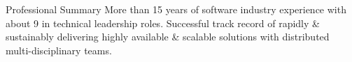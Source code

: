 \documentclass{resume} %
\begin{document}
\vspace{1em}

\begin{rSection}{Professional Summary}
More than 15 years of software industry experience with about 9 in technical leadership roles. Successful track record of rapidly \& sustainably delivering highly available \& scalable solutions with distributed multi-disciplinary teams.
\end{rSection}

\end{document}
